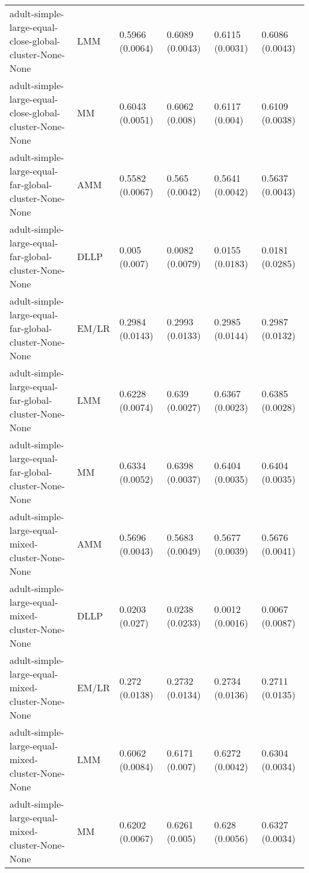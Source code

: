 \begin{tabular}{llllll}
                                adult-simple-large-equal-close-global-cluster-None-None &       LMM & 0.5966 (0.0064) &  0.6089 (0.0043) &   0.6115 (0.0031) &     0.6086 (0.0043) \\
                                adult-simple-large-equal-close-global-cluster-None-None &        MM & 0.6043 (0.0051) &   0.6062 (0.008) &    0.6117 (0.004) &     0.6109 (0.0038) \\
                                  adult-simple-large-equal-far-global-cluster-None-None &       AMM & 0.5582 (0.0067) &   0.565 (0.0042) &   0.5641 (0.0042) &     0.5637 (0.0043) \\
                                  adult-simple-large-equal-far-global-cluster-None-None &      DLLP &   0.005 (0.007) &  0.0082 (0.0079) &   0.0155 (0.0183) &     0.0181 (0.0285) \\
                                  adult-simple-large-equal-far-global-cluster-None-None &     EM/LR & 0.2984 (0.0143) &  0.2993 (0.0133) &   0.2985 (0.0144) &     0.2987 (0.0132) \\
                                  adult-simple-large-equal-far-global-cluster-None-None &       LMM & 0.6228 (0.0074) &   0.639 (0.0027) &   0.6367 (0.0023) &     0.6385 (0.0028) \\
                                  adult-simple-large-equal-far-global-cluster-None-None &        MM & 0.6334 (0.0052) &  0.6398 (0.0037) &   0.6404 (0.0035) &     0.6404 (0.0035) \\
                                       adult-simple-large-equal-mixed-cluster-None-None &       AMM & 0.5696 (0.0043) &  0.5683 (0.0049) &   0.5677 (0.0039) &     0.5676 (0.0041) \\
                                       adult-simple-large-equal-mixed-cluster-None-None &      DLLP &  0.0203 (0.027) &  0.0238 (0.0233) &   0.0012 (0.0016) &     0.0067 (0.0087) \\
                                       adult-simple-large-equal-mixed-cluster-None-None &     EM/LR &  0.272 (0.0138) &  0.2732 (0.0134) &   0.2734 (0.0136) &     0.2711 (0.0135) \\
                                       adult-simple-large-equal-mixed-cluster-None-None &       LMM & 0.6062 (0.0084) &   0.6171 (0.007) &   0.6272 (0.0042) &     0.6304 (0.0034) \\
                                       adult-simple-large-equal-mixed-cluster-None-None &        MM & 0.6202 (0.0067) &   0.6261 (0.005) &    0.628 (0.0056) &     0.6327 (0.0034) \\

\end{tabular}
